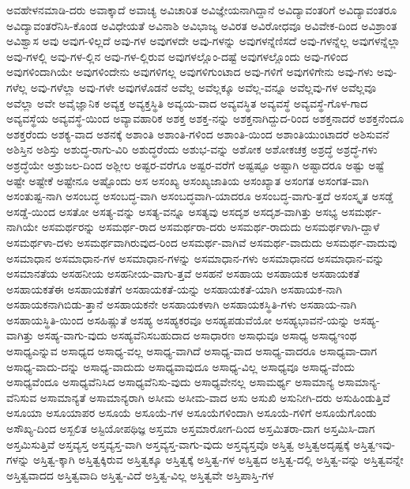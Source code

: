 {ಅವಹೇಳನಮಾಡಿ-ದರು
ಅವಾಕ್ಕಾದೆ
ಅವಾಚ್ಯ
ಅವಿಚಾರಿತ
ಅವಿಜ್ಞೇಯನಾಗಿದ್ದಾನೆ
ಅವಿದ್ಯಾವಂತರಿಗೆ
ಅವಿದ್ಯಾವಂತರೂ
ಅವಿದ್ಯಾವಂತರೆನಿಸಿ-ಕೊಂಡ
ಅವಿಧೇಯತೆ
ಅವಿನಾಶಿ
ಅವಿಭಾಜ್ಯ
ಅವಿರತ
ಅವಿರೋಧವೂ
ಅವಿವೇಕ-ದಿಂದ
ಅವಿಶ್ರಾಂತ
ಅವಿಶ್ವಾಸ
ಅವು
ಅವುಗ-ಳಿಲ್ಲದೆ
ಅವು-ಗಳ
ಅವುಗಳದೇ
ಅವು-ಗಳನ್ನು
ಅವುಗಳನ್ನೆಣಿಸದೆ
ಅವು-ಗಳನ್ನೆಲ್ಲ
ಅವುಗಳನ್ನೆಲ್ಲಾ
ಅವು-ಗಳಲ್ಲಿ
ಅವು-ಗಳ-ಲ್ಲಿನ
ಅವು-ಗಳ-ಲ್ಲಿರುವ
ಅವುಗಳಲ್ಲೊಂ-ದಷ್ಟೆ
ಅವುಗಳಲ್ಲೊಂದು
ಅವು-ಗಳಿಂದ
ಅವುಗಳಿಂದಾಗಿಯೇ
ಅವುಗಳಿಂದೇನು
ಅವುಗಳಿಗಲ್ಲ
ಅವುಗಳಿಗುಂಟಾದ
ಅವು-ಗಳಿಗೆ
ಅವುಗಳಿಗೇನು
ಅವು-ಗಳು
ಅವು-ಗಳೆಲ್ಲ
ಅವು-ಗಳೆಲ್ಲಾ
ಅವು-ಗಳೇ
ಅವುಗಳೊಡನೆ
ಅವೆಲ್ಲ
ಅವೆಲ್ಲಕ್ಕೂ
ಅವೆಲ್ಲ-ವನ್ನೂ
ಅವೆಲ್ಲವು-ಗಳ
ಅವೆಲ್ಲವೂ
ಅವೆಲ್ಲಾ
ಅವೇ
ಅವೈಜ್ಞಾನಿಕ
ಅವ್ಯಕ್ತ
ಅವ್ಯಕ್ತಸ್ಥಿತಿ
ಅವ್ಯಯ-ವಾದ
ಅವ್ಯವಸ್ಥಿತ
ಅವ್ಯವಸ್ಥೆ
ಅವ್ಯವಸ್ಥೆ-ಗೊಳ-ಗಾದ
ಅವ್ಯವಸ್ಥೆಯ
ಅವ್ಯವಸ್ಥೆ-ಯಿಂದ
ಅವ್ಯಾವಹಾರಿಕ
ಅಶಕ್ತ
ಅಶಕ್ತ-ನನ್ನು
ಅಶಕ್ತನಾಗಿದ್ದುದ-ರಿಂದ
ಅಶಕ್ತನಾದರೆ
ಅಶಕ್ತನೆಂದೂ
ಅಶಕ್ತರೆಂದು
ಅಶಕ್ಯ-ವಾದ
ಅಶನಕ್ಕೆ
ಅಶಾಂತಿ
ಅಶಾಂತಿ-ಗಳಿಂದ
ಅಶಾಂತಿ-ಯಿಂದ
ಅಶಾಂತಿಯುಂಟಾದರೆ
ಅಶಿಸುವನೆ
ಅಶಿಸ್ತಿನ
ಅಶಿಸ್ತು
ಅಶುದ್ಧ-ರಾಗು-ವಿರಿ
ಅಶುದ್ಧರೆಂದು
ಅಶುಭ-ವನ್ನು
ಅಶೋಕ
ಅಶೋಕಚಕ್ರ
ಅಶ್ರದ್ಧೆ
ಅಶ್ರದ್ಧೆ-ಗಳು
ಅಶ್ರದ್ಧೆಯೇ
ಅಶ್ರುಜಲ-ದಿಂದ
ಅಶ್ಲೀಲ
ಅಷ್ಟರ-ವರೆಗೂ
ಅಷ್ಟರ-ವರೆಗೆ
ಅಷ್ಟಷ್ಟೂ
ಅಷ್ಟಾಗಿ
ಅಷ್ಟಾದರೂ
ಅಷ್ಟು
ಅಷ್ಟೆ
ಅಷ್ಟೇ
ಅಷ್ಟೇಕೆ
ಅಷ್ಟೇನೂ
ಅಷ್ಟೊಂದು
ಅಸ
ಅಸಂಖ್ಯ
ಅಸಂಖ್ಯಜಾತಿಯ
ಅಸಂಖ್ಯಾತ
ಅಸಂಗತ
ಅಸಂಗತ-ವಾಗಿ
ಅಸಂತುಷ್ಟ-ನಾಗಿ
ಅಸಂಬದ್ಧ
ಅಸಂಬದ್ಧ-ವಾಗಿ
ಅಸಂಬದ್ಧವಾಗಿ-ಯಾದರೂ
ಅಸಂಬದ್ಧ-ವಾಗು-ತ್ತದೆ
ಅಸಂಸ್ಕೃತ
ಅಸಡ್ಡೆ
ಅಸಡ್ಡೆ-ಯಿಂದ
ಅಸತೋ
ಅಸತ್ಯ-ವನ್ನು
ಅಸತ್ಯ-ವನ್ನೂ
ಅಸತ್ಯವು
ಅಸದೃಶ
ಅಸದೃಶ-ವಾಗಿತ್ತು
ಅಸಭ್ಯ
ಅಸಮರ್ಥ-ನಾಗಿಯೇ
ಅಸಮರ್ಥರನ್ನು
ಅಸಮರ್ಥ-ರಾದ
ಅಸಮರ್ಥರಾ-ದರು
ಅಸಮರ್ಥ-ರಾದುದು
ಅಸಮರ್ಥಳಾಗಿ-ದ್ದಾಳೆ
ಅಸಮರ್ಥಳಾ-ದಳು
ಅಸಮರ್ಥವಾಗಿರುವುದ-ರಿಂದ
ಅಸಮರ್ಥ-ವಾಗಿವೆ
ಅಸಮರ್ಥ-ವಾದುದು
ಅಸಮರ್ಥ-ವಾದುವು
ಅಸಮಾಧಾನ
ಅಸಮಾಧಾನ-ಗಳ
ಅಸಮಾಧಾನ-ಗಳನ್ನು
ಅಸಮಾಧಾನ-ಗಳು
ಅಸಮಾಧಾನದ
ಅಸಮಾಧಾನ-ವನ್ನು
ಅಸಮಾನತೆಯ
ಅಸಹನೀಯ
ಅಸಹನೀಯ-ವಾಗು-ತ್ತವೆ
ಅಸಹನೆ
ಅಸಹಾಯ
ಅಸಹಾಯಕ
ಅಸಹಾಯಕತೆ
ಅಸಹಾಯಕತೆಈ
ಅಸಹಾಯಕತೆಗೆ
ಅಸಹಾಯಕತೆ-ಯನ್ನು
ಅಸಹಾಯಕತೆ-ಯಾಗಿ
ಅಸಹಾಯಕ-ನಾಗಿ
ಅಸಹಾಯಕನಾಗಿಬಿಡು-ತ್ತಾನೆ
ಅಸಹಾಯಕನೇ
ಅಸಹಾಯಕಳಾಗಿ
ಅಸಹಾಯಕಸ್ಥಿತಿ-ಗಳು
ಅಸಹಾಯ-ನಾಗಿ
ಅಸಹಾಯಸ್ಥಿತಿ-ಯಿಂದ
ಅಸಹಿಷ್ಣುತೆ
ಅಸಹ್ಯ
ಅಸಹ್ಯಕರವೂ
ಅಸಹ್ಯಪಡುವೆಯೋ
ಅಸಹ್ಯಭಾವನೆ-ಯನ್ನು
ಅಸಹ್ಯ-ವಾಗಿತ್ತು
ಅಸಹ್ಯ-ವಾಗು-ವುದು
ಅಸಹ್ಯವೆನಿಸಬಹುದಾದ
ಅಸಾಧಾರಣ
ಅಸಾಧುವೂ
ಅಸಾಧ್ಯ
ಅಸಾಧ್ಯಇಂಥ
ಅಸಾಧ್ಯಎನ್ನುವ
ಅಸಾಧ್ಯದ
ಅಸಾಧ್ಯ-ವಲ್ಲ
ಅಸಾಧ್ಯ-ವಾಗಿದೆ
ಅಸಾಧ್ಯ-ವಾದ
ಅಸಾಧ್ಯ-ವಾದರೂ
ಅಸಾಧ್ಯವಾ-ದಾಗ
ಅಸಾಧ್ಯ-ವಾದು-ದನ್ನು
ಅಸಾಧ್ಯ-ವಾದುದು
ಅಸಾಧ್ಯವಾವುದೂ
ಅಸಾಧ್ಯ-ವಿಲ್ಲ
ಅಸಾಧ್ಯವೂ
ಅಸಾಧ್ಯ-ವೆಂದು
ಅಸಾಧ್ಯವೆಂದೂ
ಅಸಾಧ್ಯವೆನಿಸಿದ
ಅಸಾಧ್ಯವೆನಿಸು-ವುದು
ಅಸಾಧ್ಯವೇನಲ್ಲ
ಅಸಾಮರ್ಥ್ಯ
ಅಸಾಮಾನ್ಯ
ಅಸಾಮಾನ್ಯ-ವೆನಿಸುವ
ಅಸಾಮಾನ್ಯತೆ
ಅಸಾಮಾನ್ಯರಾಗಿ
ಅಸೀಮ
ಅಸೀಮ-ವಾದ
ಅಸು
ಅಸುಖಿ
ಅಸುನೀಗಿ-ದರು
ಅಸುಹಿಂಡುತ್ತಿವೆ
ಅಸೂಯಾ
ಅಸೂಯಾಪರ
ಅಸೂಯೆ
ಅಸೂಯೆ-ಗಳ
ಅಸೂಯೆಗಳಿಂದಾಗಿ
ಅಸೂಯೆ-ಗಳಿಗೆ
ಅಸೂಯೆಗೊಂಡು
ಅಸೌಖ್ಯ-ದಿಂದ
ಅಸ್ಖಲಿತ
ಅಸ್ಟಿಯೋಪಥಿಜ್ಞ
ಅಸ್ತಮಾ
ಅಸ್ತಮಾರೋಗ-ದಿಂದ
ಅಸ್ತಮಿತರಾ-ದಾಗ
ಅಸ್ತಮಿಸಿ-ದಾಗ
ಅಸ್ತಮಿಸುತ್ತಿವೆ
ಅಸ್ತವ್ಯಸ್ತ
ಅಸ್ತವ್ಯಸ್ತ-ವಾಗಿ
ಅಸ್ತವ್ಯಸ್ತ-ವಾಗು-ವುದು
ಅಸ್ತವ್ಯಸ್ತವೊ
ಅಸ್ತಿತ್ವ
ಅಸ್ತಿತ್ವಅದೃಷ್ಟಕ್ಕೆ
ಅಸ್ತಿತ್ವಇವು-ಗಳನ್ನು
ಅಸ್ತಿತ್ವ-ಕ್ಕಾಗಿ
ಅಸ್ತಿತ್ವಕ್ಕಿರುವ
ಅಸ್ತಿತ್ವಕ್ಕೂ
ಅಸ್ತಿತ್ವಕ್ಕೆ
ಅಸ್ತಿತ್ವ-ಗಳ
ಅಸ್ತಿತ್ವದ
ಅಸ್ತಿತ್ವ-ದಲ್ಲಿ
ಅಸ್ತಿತ್ವ-ವನ್ನು
ಅಸ್ತಿತ್ವವನ್ನೇ
ಅಸ್ತಿತ್ವವಾದದ
ಅಸ್ತಿತ್ವವಾದಿ
ಅಸ್ತಿತ್ವ-ವಿದೆ
ಅಸ್ತಿತ್ವ-ವಿಲ್ಲ
ಅಸ್ತಿತ್ವವೇ
ಅಸ್ತಿಪಾಸ್ತಿ-ಗಳ
}

